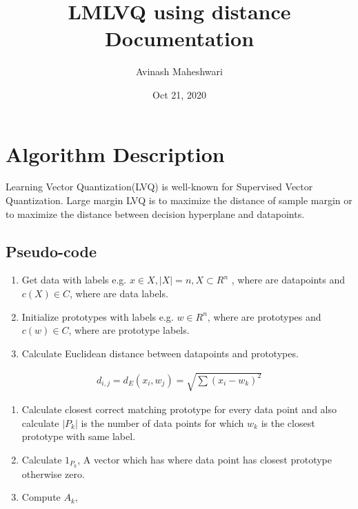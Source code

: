 \documentclass[letterpaper,10pt,english]{sphinxmanual}
\title{LMLVQ using distance Documentation}
\date{Oct 21, 2020}
\author{Avinash Maheshwari}
\begin{document}
\pagestyle{empty}
\sphinxmaketitle
\pagestyle{plain}
\sphinxtableofcontents
\pagestyle{normal}
\label{\detokenize{index::doc}}



\chapter{Algorithm Description}
\label{\detokenize{index:algorithm-description}}
Learning Vector Quantization(LVQ) is well-known for Supervised Vector Quantization. Large margin LVQ is to maximize the distance of sample margin or to maximize the distance between decision hyperplane and datapoints.


\section{Pseudo-code}
\label{\detokenize{index:pseudo-code}}\begin{enumerate}
\def\theenumi{\arabic{enumi}}
\def\labelenumi{\theenumi .}
\makeatletter\def\p@enumii{\p@enumi \theenumi .}\makeatother
\item {} 
Get data with labels e.g. \(x \in X, |X| = n, X \subset R^n\) , where  are datapoints and \(c(X) \in C\), where  are data labels.

\item {} 
Initialize prototypes with labels e.g. \(w \in R^n\), where  are prototypes and \(c(w) \in C\), where  are prototype labels.

\item {} 
Calculate Euclidean distance between datapoints and prototypes.

\end{enumerate}
\begin{equation*}
\begin{split}d_{i,j} = d_{E}(x_i , w_j) = \sqrt{\sum (x_i - w_k)^2}\end{split}
\end{equation*}\begin{enumerate}
\def\theenumi{\arabic{enumi}}
\def\labelenumi{\theenumi .}
\makeatletter\def\p@enumii{\p@enumi \theenumi .}\makeatother
\setcounter{enumi}{3}
\item {} 
Calculate closest correct matching prototype for every data point and also calculate \(|P_k|\) is the number of data points for which \(w_k\) is the closest prototype with same label.

\item {} 
Calculate \(1_{P_k}\), A vector which has  where data point has closest prototype otherwise zero.

\item {} 
Compute \(A_k\),

\end{enumerate}
\end{document}
